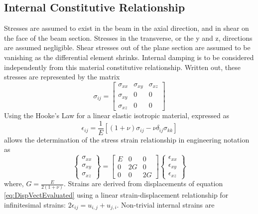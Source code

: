\subsection{Internal Constitutive Relationship} \label{Internal Constitutive Relationship}
Stresses are assumed to exist in the beam in the axial direction, and in shear on the face of the beam section. Stresses in the transverse, or the y and z, directions are assumed negligible. Shear stresses out of the plane section are assumed to be vanishing as the differential element shrinks. Internal damping is to be considered independently from this material constitutive relationship. Written out, these stresses are represented by the matrix
\begin{equation}\label{key}
\sigma_{ij}=\left[\begin{array}{ccc}
\sigma_{xx}&\sigma_{xy}&\sigma_{xz}\\
\sigma_{xy}&0&0\\
\sigma_{xz}&0&0
\end{array}\right]
\end{equation}
Using the Hooke's Law for a linear elastic isotropic material, expressed as
\begin{equation}\label{key}
\epsilon_{ij}=\frac{1}{E}[(1+\nu)\sigma_{ij}-\nu\delta_{ij}\sigma_{kk}]
\end{equation}
allows the determination of the stress strain relationship in engineering notation as
\begin{equation}\label{eq:ConstitutiveRelationshipEngineeringNotation}
\left\{\begin{array}{c}
\sigma_{xx}\\ \sigma_{xy}\\ \sigma_{xz}
\end{array}\right\} = \left[\begin{array}{ccc}
E&0&0\\0&2G&0\\0&0&2G
\end{array}\right] \left\{\begin{array}{c}
\epsilon_{xx}\\ \epsilon_{xy}\\ \epsilon_{xz}
\end{array}\right\}
\end{equation}
where, $ G=\frac{E}{2(1+\nu)} $. Strains are derived from displacements of equation \eqref{eq:DispVectEvaluated} using a linear strain-displacement relationship for infinitesimal strains: $ 2\epsilon_{ij}=u_{i,j}+u_{j,i} $. Non-trivial internal strains are
